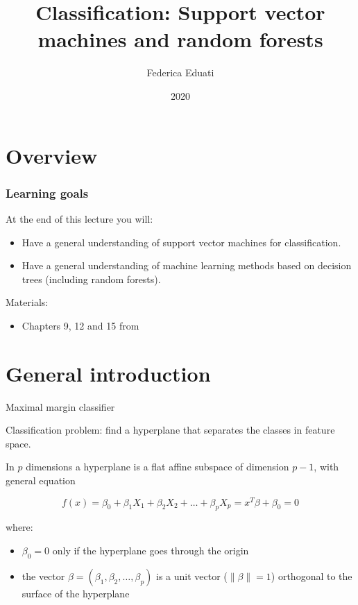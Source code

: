 \documentclass[notes]{beamer}          %
\title{Classification: Support vector machines and random forests}
\author{Federica Eduati}
\institute{Eindhoven University of Technology

Department of Biomedical Engineering}
\date{2020}
\newcommand{\norm}[1]{\left\lVert#1\right\rVert}
\providecommand{\norm}[1]{\lVert#1\rVert}
\begin{document}
 
\frame{\titlepage}
 
\section{Overview}

\begin{frame}
\frametitle{Learning goals}
At the end of this lecture you will:
\begin{itemize}
    \item Have a general understanding of support vector machines for classification.
    \item Have a general understanding of machine learning methods based on decision trees (including random forests).
\end{itemize}

\vspace{5mm} 

Materials: 
\begin{itemize}
    \item Chapters 9, 12 and 15 from \cite{elements}
\end{itemize}

\end{frame}


\section{General introduction}
\begin{frame}{Maximal margin classifier}

Classification problem: find a hyperplane that separates the classes in feature space.

\vspace{5mm} 

In $p$ dimensions a hyperplane is a flat affine subspace of dimension $p-1$, with general equation

\begin{equation}
    f(x) = \beta_0 + \beta_1 X_1 + \beta_2 X_2 + \dots + \beta_p X_p = x^T\beta + \beta_0 = 0
\end{equation}

where:
\begin{itemize}
    \item $\beta_0 = 0$ only if the hyperplane goes through the origin \item the vector $\beta = (\beta_1, \beta_2, \dots, \beta_p)$ is a unit vector ($\norm{\beta} = 1$) orthogonal to the surface of the hyperplane
\end{itemize}
    
\end{frame}
\end{document}
